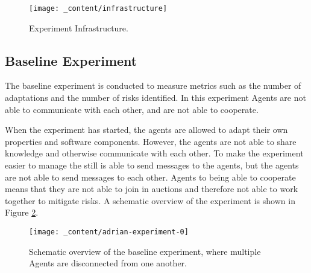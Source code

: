 \begin{figure}[H]
    \centering
    \texttt{[image: \_content/infrastructure]}
    \caption{Experiment Infrastructure.}
    \label{fig:infrastructure}
\end{figure}

\subsection{Baseline Experiment}


The baseline experiment is conducted to measure metrics such as the number of adaptations and the number of risks identified. In this experiment Agents are not able to communicate with each other, and are not able to cooperate. 

When the experiment has started, the agents are allowed to adapt their own properties and software components. However, the agents are not able to share knowledge and otherwise communicate with each other. To make the experiment easier to manage the  still is able to send messages to the agents, but the agents are not able to send messages to each other.  Agents to being able to cooperate means that they are not able to join in auctions and therefore not able to work together to mitigate risks. A schematic overview of the experiment is shown in Figure \ref{fig:baseline}.

\begin{figure}[H]
    \centering
    \texttt{[image: \_content/adrian-experiment-0]}
    \caption{Schematic overview of the baseline experiment, where multiple Agents are disconnected from one another.}
    \label{fig:baseline}
\end{figure}

